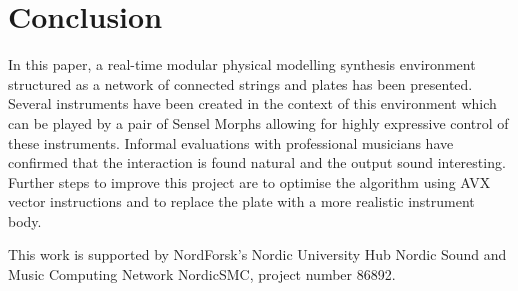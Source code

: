 \documentclass{article}
\begin{document}

\section{Conclusion}\label{sec:conclusion}

In this paper, a real-time modular physical modelling synthesis environment structured as a network of connected strings and plates has been presented. Several instruments have been created in the context of this environment which can be played by a pair of Sensel Morphs allowing for highly expressive control of these instruments. Informal evaluations with professional musicians have confirmed that the interaction is found natural and the output sound interesting. Further steps to improve this project are to optimise the algorithm using AVX vector instructions and to replace the plate with a more realistic  instrument body.
 \begin{acknowledgments}
This work is supported by NordForsk's Nordic
University Hub Nordic Sound and Music Computing Network
NordicSMC, project number 86892.

 \end{acknowledgments} 

\begin{small}

\end{small}
\end{document}
